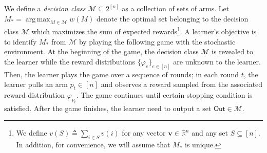 \documentclass{article}
\newcommand{\Rew}{\varphi}
\newcommand{\E}{\mathbb E}
\newcommand{\M}{\mathcal M}
\newcommand{\RR}{\mathbb R}
\DeclareMathOperator*{\argmax}{arg\,max}
\newcommand{\out}{\mathsf{Out}}
\renewcommand{\vec}[1]{\boldsymbol{#1}}
\begin{document}
We define a \emph{decision class} $\M \subseteq 2^{[n]}$ as a  collection of sets of arms.
Let $M_*=\argmax_{M\in \M} w(M)$ denote the optimal set belonging to the decision class $\M$ which maximizes the sum of expected rewards\footnote{We define $v(S)\triangleq \sum_{i\in S} v(i)$ for any vector $\vec v\in\RR^{n}$ and any set $S \subseteq[n]$. In addition, for convenience, we will assume that $M_*$ is unique.}.
A learner's objective is to identify $M_*$ from $\M$ by playing the following game with the stochastic environment.
At the beginning of the game, the decision class $\M$ is revealed to the learner while the reward distributions $\{\Rew_e\}_{e\in[n]}$ are unknown to the learner.
Then, the learner plays the game over a sequence of rounds;
in each round $t$, the learner pulls an arm $p_t\in [n]$ and observes a reward sampled from the associated reward distribution $\Rew_{p_t}$.
The game continues until certain stopping condition is satisfied.
After the game finishes, the learner need to output a set $\out \in \M$.



\end{document}
